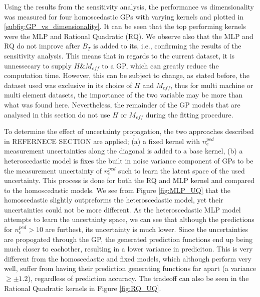 \documentclass[a4paper, twoside, final, 12pt]{article}
\begin{document}
{Using the results from the sensitivity analysis, the performance vs dimensionality was measured for four homoscedastic GPs with varying kernels and plotted in \ref{subfig:GP_vs_dimensionality}. It can be seen that the top performing kernels were the MLP and Rational Quadratic (RQ). We observe also that the MLP and RQ do not improve after $B_T$ is added to its, i.e., confirming the results of the sensitivity analysis. This means that in regards to the current dataset, it is unnessecary to supply $H \& M_{eff}$ to a GP, which can greatly reduce the computation time. However, this can be subject to change, as stated before, the dataset used was exclusive in its choice of $H$ and $M_{eff}$, thus for multi machine or multi element datasets, the importance of the two variable may be more than what was found here. Nevertheless, the remainder of the GP models that are analysed in this section do not use $H$ or $M_{eff}$ during the fitting procedure. 

To determine the effect of uncertainty propagation, the two approaches described in REFERNECE SECTION are applied; (a) a fixed kernel with $n_e^{ped}$ measurement uncertainties along the diagonal is added to a base kernel, (b) a heteroscedastic model is fixes the built in noise variance component of GPs to be the measurement uncertainty of $n_e^{ped}$ such to learn the latent space of the used uncertainty. This process is done for both the RQ and MLP kernel and compared to the homoscedastic models.
We see from Figure \ref{fig:MLP_UQ} that the homoscedastic slightly outpreforms the heteroscedastic model, yet their uncertainties could not be more different. As the heteroscedastic MLP model attempts to learn the uncertainty space, we can see that although the predictions for $n_e^{ped} > 10$ are furthest, its uncertainty is much lower. Since the uncertainties are propogated through the GP, the generated prediction functions end up being much closer to eachother, resulting in a lower variance in prediciton. This is very different from the homoscedastic and fixed models, which although perform very well, suffer from having their prediction generating functions far apart (a variance $ \geq \pm 1.2$), regardless of prediction accuracy. The tradeoff can also be seen in the Rational Quadratic kernels in Figure \ref{fig:RQ_UQ}.

}
\end{document}
